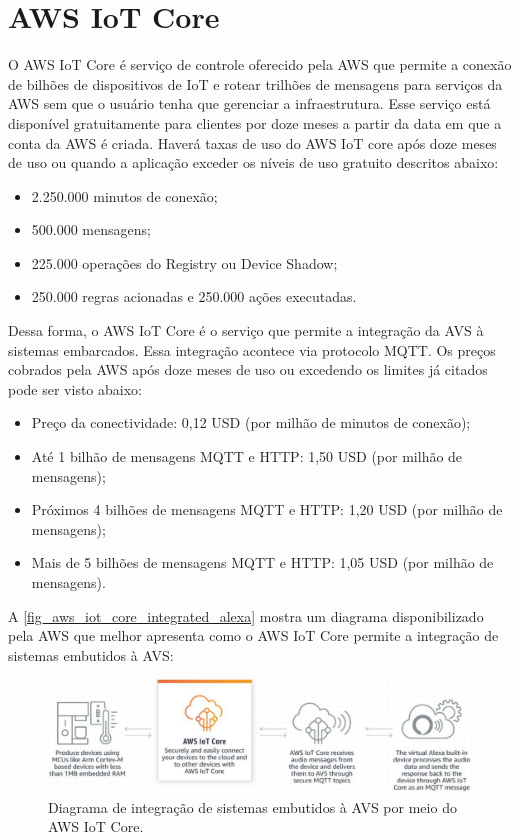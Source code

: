 \documentclass[
    12pt,
    openright,
    twoside,
    a4paper,
    english,
    spanish,
    brazil,
    ]{abntex2}
\begin{document}
\section{AWS IoT Core}\label{section_aws_iot_core}
O AWS IoT Core é serviço de controle oferecido pela AWS que permite a conexão de bilhões de dispositivos de IoT e rotear trilhões de mensagens para serviços da AWS sem que o usuário tenha que gerenciar a infraestrutura. Esse serviço está disponível gratuitamente para clientes por doze meses a partir da data em que a conta da AWS é criada. Haverá taxas de uso do AWS IoT core após doze meses de uso ou quando a aplicação exceder os níveis de uso gratuito descritos abaixo:
\begin{itemize}
	\item 2.250.000 minutos de conexão;
	\item 500.000 mensagens;
	\item 225.000 operações do Registry ou Device Shadow;
	\item 250.000 regras acionadas e 250.000 ações executadas.
\end{itemize}

Dessa forma, o AWS IoT Core é o serviço que permite a integração da AVS à sistemas embarcados. Essa integração acontece via protocolo MQTT. Os preços cobrados pela AWS após doze meses de uso ou excedendo os limites já citados pode ser visto abaixo:
\begin{itemize}
	\item Preço da conectividade: 0,12 USD (por milhão de minutos de conexão);
	\item Até 1 bilhão de mensagens MQTT e HTTP: 1,50 USD (por milhão de mensagens);
	\item Próximos 4 bilhões de mensagens MQTT e HTTP: 1,20 USD (por milhão de mensagens);
	\item Mais de 5 bilhões de mensagens MQTT e HTTP: 1,05 USD (por milhão de mensagens).
\end{itemize}

A \autoref{fig_aws_iot_core_integrated_alexa} mostra um diagrama disponibilizado pela AWS que melhor apresenta como o AWS IoT Core permite a integração de sistemas embutidos à AVS:
\begin{figure}[htb]
	\caption{Diagrama de integração de sistemas embutidos à AVS por meio do AWS IoT Core.}\label{fig_aws_iot_core_integrated_alexa}
	\begin{center}
		\includegraphics[scale=0.5]{Images/aws_iot_core_integrated_alexa.pdf}
	\end{center}
\end{figure}
\end{document}
